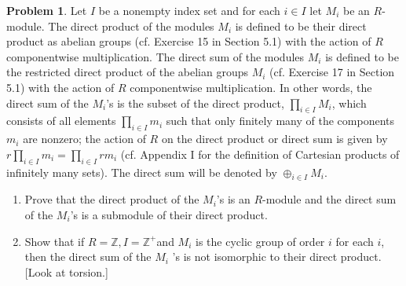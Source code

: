 \documentclass{amsart}
\numberwithin{equation}{section}
\theoremstyle{definition}
\newtheorem{problem}[thm]{Problem}
\begin{document}



\begin{problem}
  Let \(I\) be a nonempty index set and for each \(i \in I\) let \(M_i\) be an \(R\)-module. The direct product of the modules \(M_i\) is defined to be their direct product as abelian groups (cf. Exercise 15 in Section 5.1) with the action of \(R\) componentwise multiplication. The direct sum of the modules \(M_i\) is defined to be the restricted direct product of the abelian groups \(M_i\) (cf. Exercise 17 in Section 5.1) with the action of \(R\) componentwise multiplication. In other words, the direct sum of the \(M_i\)'s is the subset of the direct product, \(\prod_{i \in I} M_i\), which consists of all elements \(\prod_{i \in I} m_i\) such that only finitely many of the components \(m_i\) are nonzero; the action of \(R\) on the direct product or direct sum is given by \(r \prod_{i \in I} m_i=\prod_{i \in I} r m_i\) (cf. Appendix I for the definition of Cartesian products of infinitely many sets). The direct sum will be denoted by \(\oplus_{i \in I} M_i\).
  \begin{enumerate}
  \item Prove that the direct product of the \(M_i\)'s is an \(R\)-module and the direct sum of the \(M_i\)'s is a submodule of their direct product.
  \item Show that if \(R=\mathbb{Z}, I=\mathbb{Z}^{+}\)and \(M_i\) is the cyclic group of order \(i\) for each \(i\), then the direct sum of the \(M_i\) 's is not isomorphic to their direct product. [Look at torsion.]
  \end{enumerate}
\end{problem}

\end{document}
